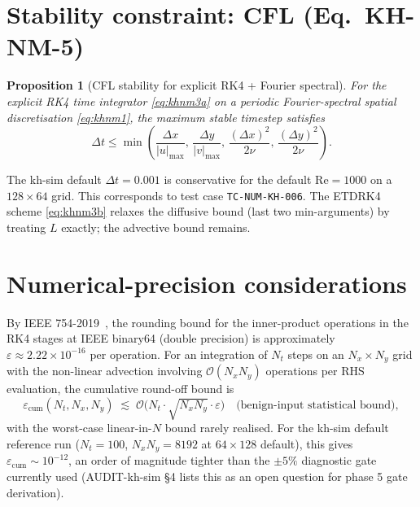 \documentclass[11pt,a4paper]{article}
\theoremstyle{definition}
\theoremstyle{plain}
\newtheorem{proposition}{Proposition}
\begin{document}
\section{Stability constraint: CFL (Eq.\ KH-NM-5)}

\begin{proposition}[CFL stability for explicit RK4 + Fourier spectral]
For the explicit RK4 time integrator
\eqref{eq:khnm3a} on a periodic Fourier-spectral spatial
discretisation \eqref{eq:khnm1}, the maximum stable timestep
satisfies
\begin{equation}
\label{eq:khnm5}
\Delta t \leq \min\!\left(\frac{\Delta x}{\lvert u \rvert_{\max}},\,
                          \frac{\Delta y}{\lvert v \rvert_{\max}},\,
                          \frac{(\Delta x)^2}{2\nu},\,
                          \frac{(\Delta y)^2}{2\nu}\right).
\tag{KH-NM-5}
\end{equation}
\end{proposition}

The kh-sim default $\Delta t = 0.001$ is conservative for the
default $\mathrm{Re} = 1000$ on a $128 \times 64$ grid. This
corresponds to test case \texttt{TC-NUM-KH-006}. The ETDRK4 scheme
\eqref{eq:khnm3b} relaxes the diffusive bound (last two min-arguments)
by treating $L$ exactly; the advective bound remains.

\section{Numerical-precision considerations}

By IEEE 754-2019~\cite{IEEE754_2019}, the rounding bound for the
inner-product operations in the RK4 stages at IEEE binary64 (double
precision) is approximately $\varepsilon \approx 2.22 \times 10^{-16}$
per operation. For an integration of $N_t$ steps on an $N_x \times N_y$
grid with the non-linear advection involving $\mathcal{O}(N_x N_y)$
operations per RHS evaluation, the cumulative round-off bound is
\[
\varepsilon_{\text{cum}}(N_t, N_x, N_y)
\;\lesssim\;
\mathcal{O}\bigl( N_t \cdot \sqrt{N_x N_y} \cdot \varepsilon \bigr)
\quad\text{(benign-input statistical bound)},
\]
with the worst-case linear-in-$N$ bound rarely realised. For the
kh-sim default reference run ($N_t = 100$, $N_x N_y = 8192$ at
$64 \times 128$ default), this gives $\varepsilon_{\text{cum}} \sim
10^{-12}$, an order of magnitude tighter than the $\pm 5\%$ diagnostic
gate currently used (AUDIT-kh-sim §4 lists this as an open question
for phase 5 gate derivation).
\end{document}

